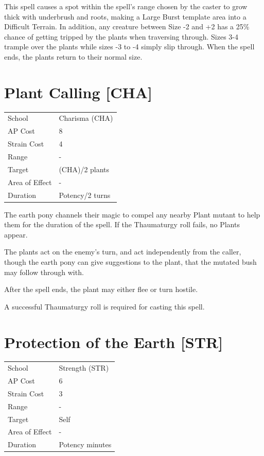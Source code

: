 \documentclass[11pt,a4paper,twocolumn]{book}
\begin{document}
This spell causes a spot within the spell's range chosen by the caster to grow thick with underbrush and roots, making a Large Burst template area into a Difficult Terrain.
In addition, any creature between Size -2 and +2 has a 25\% chance of getting tripped by the plants when traversing through. Sizes 3-4 trample over the plants while sizes -3 to -4 simply slip through. When the spell ends, the plants return to their normal size.


\section*{Plant Calling [CHA]}
{
	\begin{tabu} to 75mm{| X[l,4] | X[l,7] |}
		\hline
		School 			& Charisma (CHA) 	\\
        AP Cost	      	& 8 				\\
        Strain Cost     & 4 				\\
        Range     		& - 				\\
        Target      	& (CHA)/2 plants 	\\
        Area of Effect  & - 	 			\\
        Duration     	& Potency/2 turns 	\\ \hline
	\end{tabu}
		
}

\medskip

The earth pony channels their magic to compel any nearby Plant mutant to help them for the duration of the spell. If the Thaumaturgy roll fails, no Plants appear.

The plants act on the enemy's turn, and act independently from the caller, though the earth pony can give suggestions to the plant, that the mutated bush may follow through with.

After the spell ends, the plant may either flee or turn hostile.

A successful Thaumaturgy roll is required for casting this spell.


\section*{Protection of the Earth [STR]}
{
	\begin{tabu} to 75mm{| X[l,4] | X[l,7] |}
		\hline
		School 			& Strength (STR) 	\\
        AP Cost	      	& 6 				\\
        Strain Cost     & 3 				\\
        Range     		& - 				\\
        Target      	& Self 				\\
        Area of Effect  & - 	 			\\
        Duration     	& Potency minutes 	\\ \hline
	\end{tabu}
		
}
\end{document}
